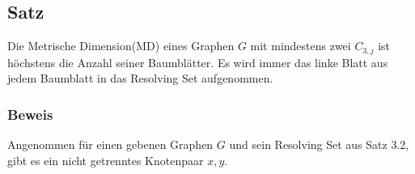 \documentclass{article}
\begin{document}
\subsection{Satz}
Die Metrische Dimension(MD) eines Graphen $G$ mit mindestens zwei $C_{3,j}$ ist höchstens die Anzahl seiner Baumblätter. Es wird immer das linke Blatt aus jedem Baumblatt in das Resolving Set aufgenommen.

\subsubsection{Beweis}
Angenommen für einen gebenen Graphen $G$ und sein Resolving Set aus Satz 3.2, gibt es ein nicht getrenntes Knotenpaar $x,y$. 
\end{document}
